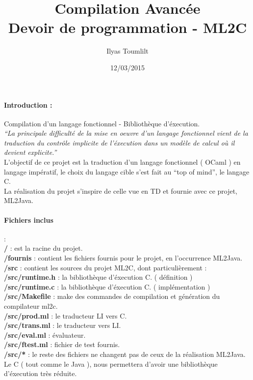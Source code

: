 \documentclass[a4paper, 11pt]{article}
\begin{document}
 
\title{Compilation Avanc\'ee\\Devoir de programmation - ML2C}
\author{Ilyas Toumlilt}
\date{12/03/2015}
 
\maketitle
 
\paragraph{Introduction :} Compilation d'un langage fonctionnel - Bibliothèque d'éxecution.\\
\textit{``La principale difficult\'e de la mise en oeuvre d'un langage fonctionnel vient de la traduction du contr\^ole implicite de l'\'execution dans un mod\`ele de calcul o\`u il devient explicite.''}\\
L'objectif de ce projet est la traduction d'un langage fonctionnel ( OCaml ) en langage impératif, le choix du langage cible s'est fait au ``top of mind'', le langage C.\\
La réalisation du projet s'inspire de celle vue en TD et fournie avec ce projet, ML2Java.

\paragraph{Fichiers inclus} :\\
\textbf{/} : est la racine du projet.\\
\textbf{/fournis} : contient les fichiers fournis pour le projet, en l'occurrence ML2Java.\\
\textbf{/src} : contient les sources du projet ML2C, dont particulièrement :\\
\textbf{/src/runtime.h} : la bibliothèque d'éxecution C. ( définition )\\
\textbf{/src/runtime.c} : la bibliothèque d'éxecution C. ( implémentation )\\
\textbf{/src/Makefile} : make des commandes de compilation et génération du compilateur ml2c.\\
\textbf{/src/prod.ml} : le traducteur LI vers C.\\
\textbf{/src/trans.ml} : le traducteur vers LI.\\
\textbf{/src/eval.ml} : évaluateur.\\
\textbf{/src/ftest.ml} : fichier de test fournis.\\
\textbf{/src/*} : le reste des fichiers ne changent pas de ceux de la réalisation ML2Java.\\
Le C ( tout comme le Java ), nous permettera d'avoir une bibliothèque d'éxecution très réduite.
\end{document}
